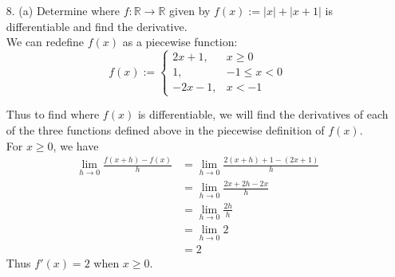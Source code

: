 \documentclass[12pt,letterpaper]{article}
\newcommand{\R}{\mathbb{R}}
\theoremstyle{case}
\theoremstyle{definition}
\begin{document}
\begin{enumerate}
\begin{enumerate}
			\begin{proof}
				We must show that $f(x)$ is not differentiable at $x=0$. By the definition of the derivative, the function $f(x)$ is differentiable at $x=0$ given that the limit exists. So, let's find the derivative at $x=0$:
				\begin{align*}
					\lim\limits_{x \to c} \frac{f(x)-f(c)}{x-c} &= \lim\limits_{x \to 0} \frac{f(x)-f(0)}{x-0} \\
					&= \lim\limits_{x \to 0} \frac{x^{\frac{1}{3}}-0^{\frac{1}{3}}}{x} \\
					&= \lim\limits_{x \to 0} \frac{x^{\frac{1}{3}}}{x} \\
					&= \lim\limits_{x \to 0} x^{\frac{1}{3}-1} \\
					&= \lim\limits_{x \to 0} x^{-\frac{2}{3}} \\
					&= \lim\limits_{x \to 0} \frac{1}{x^{\frac{2}{3}}} \\
					&= \frac{1}{0^{\frac{2}{3}}} \\
					&= \frac{1}{0} \\
					&= \text{undefined}
				\end{align*}
				Since the limit is undefined when $x=0$, we have that the limit does not exist at $x=0$, and thus $f(x)$ is not differentiable at $x=0$.\\
			\end{proof}
			\item[8. (a)] Determine where $f:\R \to \R$ given by $f(x):=|x|+|x+1|$ is differentiable and find the derivative.\\
			
			We can redefine $f(x)$ as a piecewise function:
			\[f(x):=\begin{cases}
				2x+1, & x \geq 0 \\
				1, & -1 \leq x < 0 \\
				-2x - 1, & x < -1
			\end{cases}\]
			
			Thus to find where $f(x)$ is differentiable, we will find the derivatives of each of the three functions defined above in the piecewise definition of $f(x)$.\\
			
			For $x \geq 0$, we have
			\begin{align*}
				\lim\limits_{h \to 0} \frac{f(x+h)-f(x)}{h} &= \lim\limits_{h \to 0} \frac{2(x+h)+1-(2x+1)}{h} \\
				&=\lim\limits_{h \to 0} \frac{2x+2h-2x}{h} \\
				&= \lim\limits_{h \to 0} \frac{2h}{h} \\
				&= \lim\limits_{h \to 0} 2 \\
				&= 2
			\end{align*}
			Thus $f'(x)=2$ when $x \geq 0$.\\
			

\end{enumerate}
\end{enumerate}
\end{document}
